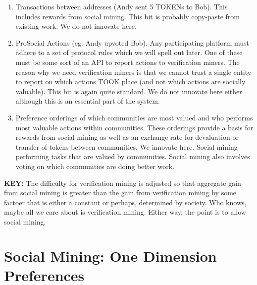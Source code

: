 \documentclass[12pt]{article}
\begin{document}
\begin{enumerate}
	\item Transactions between addresses (Andy sent 5 TOKENs to Bob). This includes rewards from social mining. This bit is probably copy-paste from existing work. We do not innovate here.
	
	\item ProSocial Actions (eg. Andy upvoted Bob). Any participating platform must adhere to a set of protocol rules which we will spell out later. One of these must be some sort of an API to report actions to verification miners. The reason why we need verification miners is that we cannot trust a single entity to report on which actions TOOK place (and not which actions are socially valuable). This bit is again quite standard. We do not innovate here either although this is an essential part of the system.
	
	\item Preference orderings of which communities are most valued and who performs most valuable actions within communities. These orderings provide a basis for rewards from social mining as well as an exchange rate for devaluation or transfer of tokens between communities. We innovate here. Social mining performing tasks that are valued by communities. Social mining also involves voting on which communities are doing better work. 
	
\end{enumerate}

\textbf{KEY:} The difficulty for verification mining is adjusted so that aggregate gain from social mining is greater than the gain from verification mining by some factoer that is either a constant or perhaps, determined by society. Who knows, maybe all we care about is verification mining. Either way, the point is to allow social mining.

\section*{Social Mining: One Dimension Preferences}
\end{document}

